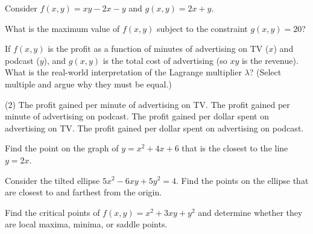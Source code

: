 \documentclass{discussion}
\author{Sections B04 and B06}
\date{Fall 2024}
\begin{document}

\begin{question}
    Consider \(f(x, y) = xy - 2x - y\) and \(g(x, y) = 2x + y\).
    \begin{subquestion}
        \item What is the maximum value of \(f(x, y)\) subject to the constraint \(g(x, y) = 20\)?
        \vspace{80pt}
        \item If \(f(x, y)\) is the profit as a function of minutes of advertising on TV (\(x\)) and podcast (\(y\)), and \(g(x, y)\) is the total cost of advertising (so \(xy\) is the revenue).
        What is the real-world interpretation of the Lagrange multiplier \(\lambda\)? (Select multiple and argue why they must be equal.)
        \begin{tasks}(2)
            \task The profit gained per minute of advertising on TV.
            \task The profit gained per minute of advertising on podcast.
            \task The profit gained per dollar spent on advertising on TV.
            \task The profit gained per dollar spent on advertising on podcast.
        \end{tasks}
    \end{subquestion}
\end{question}

\begin{question}
    Find the point on the graph of \(y = x^2 + 4x + 6\) that is the closest to the line \(y = 2x\).
\end{question}

\vspace{80pt}

\begin{question}
    Consider the tilted ellipse \(5x^2 - 6xy + 5y^2 = 4\).
    Find the points on the ellipse that are closest to and farthest from the origin.
\end{question}

\vspace{80pt}


\begin{question}
    Find the critical points of \(f(x, y) = x^2 + 3xy + y^2\) and determine whether they are local maxima, minima, or saddle points.
\end{question}
\end{document}
